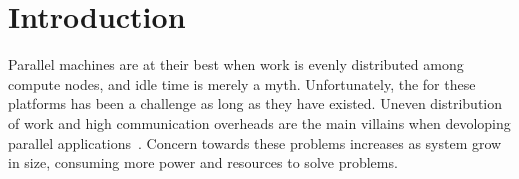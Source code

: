 \section{Introduction}


%
%
%
%
%
%
%
%
%

Parallel machines are at their best when work is evenly distributed among compute nodes, and idle time is merely a myth.
Unfortunately, the  for these platforms has been a challenge as long as they have existed.
Uneven distribution of work and high communication overheads are the main villains when devoloping parallel applications~\cite{Deveci2015, commaware}.
Concern towards these problems increases as system grow in size, consuming more power and resources to solve problems.

